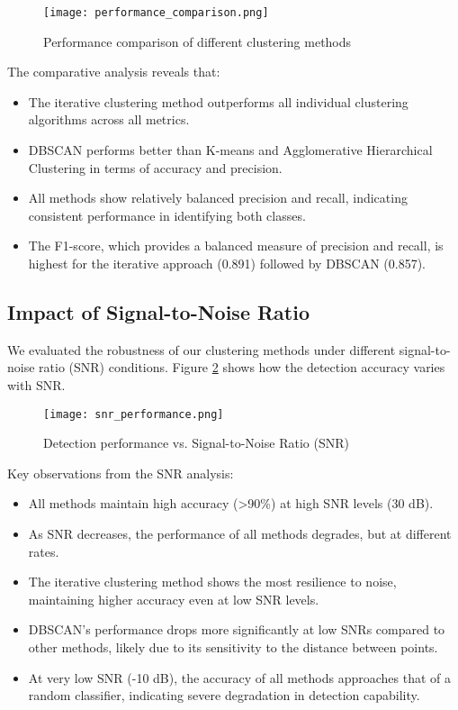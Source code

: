 \begin{figure}[h]
    \centering
    \texttt{[image: performance\_comparison.png]}
    \caption{Performance comparison of different clustering methods}
    \label{fig:performance_comparison}
\end{figure}

The comparative analysis reveals that:
\begin{itemize}
    \item The iterative clustering method outperforms all individual clustering algorithms across all metrics.
    \item DBSCAN performs better than K-means and Agglomerative Hierarchical Clustering in terms of accuracy and precision.
    \item All methods show relatively balanced precision and recall, indicating consistent performance in identifying both classes.
    \item The F1-score, which provides a balanced measure of precision and recall, is highest for the iterative approach (0.891) followed by DBSCAN (0.857).
\end{itemize}

\subsection{Impact of Signal-to-Noise Ratio}
We evaluated the robustness of our clustering methods under different signal-to-noise ratio (SNR) conditions. Figure \ref{fig:snr_performance} shows how the detection accuracy varies with SNR.

\begin{figure}[h]
    \centering
    \texttt{[image: snr\_performance.png]}
    \caption{Detection performance vs. Signal-to-Noise Ratio (SNR)}
    \label{fig:snr_performance}
\end{figure}

Key observations from the SNR analysis:
\begin{itemize}
    \item All methods maintain high accuracy (>90\%) at high SNR levels (30 dB).
    \item As SNR decreases, the performance of all methods degrades, but at different rates.
    \item The iterative clustering method shows the most resilience to noise, maintaining higher accuracy even at low SNR levels.
    \item DBSCAN's performance drops more significantly at low SNRs compared to other methods, likely due to its sensitivity to the distance between points.
    \item At very low SNR (-10 dB), the accuracy of all methods approaches that of a random classifier, indicating severe degradation in detection capability.
\end{itemize}

